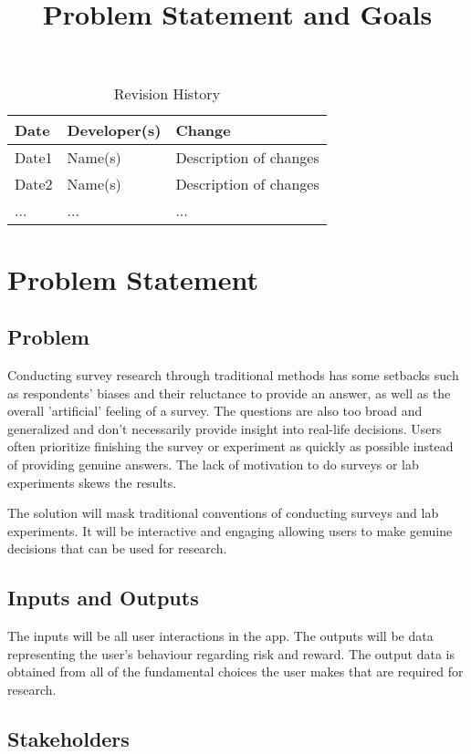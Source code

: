 \documentclass{article}
\title{Problem Statement and Goals\\\progname}
\author{\authname}
\date{}
\begin{document}
\maketitle

\begin{table}[hp]
\caption{Revision History} \label{TblRevisionHistory}
\begin{tabularx}{\textwidth}{llX}
\toprule
\textbf{Date} & \textbf{Developer(s)} & \textbf{Change}\\
\midrule
Date1 & Name(s) & Description of changes\\
Date2 & Name(s) & Description of changes\\
... & ... & ...\\
\bottomrule
\end{tabularx}
\end{table}

\section{Problem Statement}

\subsection{Problem}
Conducting survey research through traditional methods has some setbacks such as respondents' biases and their reluctance to provide an answer, as well as the overall 'artificial' feeling of a survey. The questions are also too broad and generalized and don't necessarily provide insight into real-life decisions. Users often prioritize finishing the survey or experiment as quickly as possible instead of providing genuine answers. The lack of motivation to do surveys or lab experiments skews the results.

The solution will mask traditional conventions of conducting surveys and lab experiments. It will be interactive and engaging allowing users to make genuine decisions that can be used for research.

\subsection{Inputs and Outputs}
The inputs will be all user interactions in the app. The outputs will be data representing the user's behaviour regarding risk and reward. The output data is obtained from all of the fundamental choices the user makes that are required for research. 

\subsection{Stakeholders}
\end{document}
